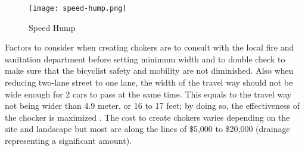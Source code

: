 \begin{figure}
\centering
\texttt{[image: speed-hump.png]}
\caption{Speed Hump}\label{fig:speed-hump}
\end{figure}

Factors to consider when creating chokers are to consult with the local fire and sanitation department before setting minimum width and to double check to make sure that the bicyclist safety and mobility are not diminished. Also when reducing two-lane street to one lane, the width of the travel way should not be wide enough for 2 cars to pass at the same time. This equals to the travel way not being wider than 4.9 meter, or 16 to 17 feet; by doing so, the effectiveness of the chocker is maximized \cite{walking-info-chokers}. The cost to create chokers varies depending on the site and landscape but most are along the lines of \$5,000 to \$20,000 (drainage representing a significant amount).